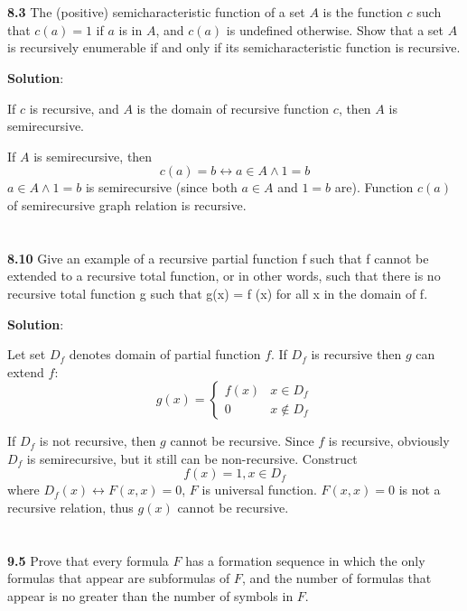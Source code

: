\documentclass{ctexart}
\begin{document}
\section*{}
\textbf{8.3} The (positive) semicharacteristic function of a set $A$ is the function $c$ such
that $c(a) = 1$ if $a$ is in $A$, and $c(a)$ is undefined otherwise. Show that a set $A$ is
recursively enumerable if and only if its semicharacteristic function is recursive.

\textbf{Solution}:

If $c$ is recursive, and $A$ is the domain of recursive function $c$, then $A$ is semirecursive.

If $A$ is semirecursive, then
$$
c(a) = b \leftrightarrow a \in A \land 1 = b
$$
$a \in A \land 1 = b$ is semirecursive (since both $a \in A$ and $1 = b$ are). Function $c(a)$
of semirecursive graph relation is recursive.

\section*{}
\textbf{8.10} Give an example of a recursive partial function f such that f
cannot be extended to a recursive total function, or in other words, such that there is no
recursive total function g such that g(x) = f (x) for all x in the domain of f.

\textbf{Solution}:

Let set $D_f$ denotes domain of partial function $f$. If $D_f$ is recursive
then $g$ can extend $f$:
$$
g(x) = \begin{cases}
	f(x) & x \in D_f \\
	0 & x \not\in D_f
\end{cases}
$$

If $D_f$ is not recursive, then $g$ cannot be recursive. Since $f$ is recursive,
obviously $D_f$ is semirecursive, but it still can be non-recursive. Construct
$$
f(x) = 1, x \in D_f
$$
where $D_f(x) \leftrightarrow F(x, x) = 0$, $F$ is universal function. $F(x, x) = 0$ is not a
recursive relation, thus $g(x)$ cannot be recursive.

\section*{}
\textbf{9.5} Prove that every formula $F$ has a formation sequence in which the only formulas
that appear are subformulas of $F$, and the number of formulas that appear is no greater than
the number of symbols in $F$.
\end{document}
